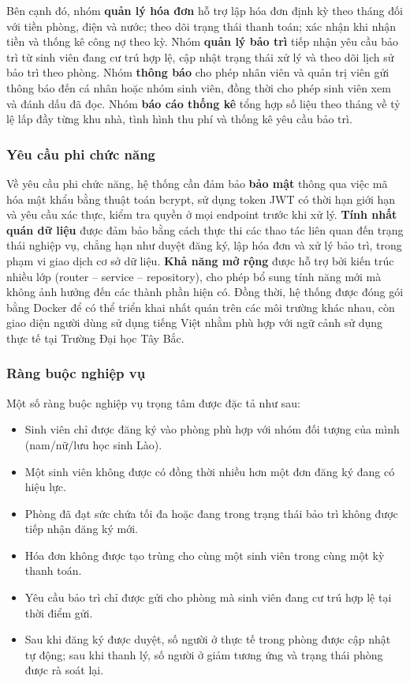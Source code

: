 \documentclass[13pt,a4paper]{extarticle}
\numberwithin{figure}{section}
\numberwithin{table}{section}
\begin{document}
	Bên cạnh đó, nhóm \textbf{quản lý hóa đơn} hỗ trợ lập hóa đơn định kỳ theo tháng đối với tiền phòng, điện và nước; theo dõi trạng thái thanh toán; xác nhận khi nhận tiền và thống kê công nợ theo kỳ. Nhóm \textbf{quản lý bảo trì} tiếp nhận yêu cầu bảo trì từ sinh viên đang cư trú hợp lệ, cập nhật trạng thái xử lý và theo dõi lịch sử bảo trì theo phòng. Nhóm \textbf{thông báo} cho phép nhân viên và quản trị viên gửi thông báo đến cá nhân hoặc nhóm sinh viên, đồng thời cho phép sinh viên xem và đánh dấu đã đọc. Nhóm \textbf{báo cáo thống kê} tổng hợp số liệu theo tháng về tỷ lệ lấp đầy từng khu nhà, tình hình thu phí và thống kê yêu cầu bảo trì.
	
	\subsubsection{Yêu cầu phi chức năng}
	
	Về yêu cầu phi chức năng, hệ thống cần đảm bảo \textbf{bảo mật} thông qua việc mã hóa mật khẩu bằng thuật toán bcrypt, sử dụng token JWT có thời hạn giới hạn và yêu cầu xác thực, kiểm tra quyền ở mọi endpoint trước khi xử lý. \textbf{Tính nhất quán dữ liệu} được đảm bảo bằng cách thực thi các thao tác liên quan đến trạng thái nghiệp vụ, chẳng hạn như duyệt đăng ký, lập hóa đơn và xử lý bảo trì, trong phạm vi giao dịch cơ sở dữ liệu. \textbf{Khả năng mở rộng} được hỗ trợ bởi kiến trúc nhiều lớp (router -- service -- repository), cho phép bổ sung tính năng mới mà không ảnh hưởng đến các thành phần hiện có. Đồng thời, hệ thống được đóng gói bằng Docker để có thể triển khai nhất quán trên các môi trường khác nhau, còn giao diện người dùng sử dụng tiếng Việt nhằm phù hợp với ngữ cảnh sử dụng thực tế tại Trường Đại học Tây Bắc.
	
	\subsubsection{Ràng buộc nghiệp vụ}
	
	Một số ràng buộc nghiệp vụ trọng tâm được đặc tả như sau:
	
	\begin{itemize}
		\item Sinh viên chỉ được đăng ký vào phòng phù hợp với nhóm đối tượng của mình (nam/nữ/lưu học sinh Lào).
		\item Một sinh viên không được có đồng thời nhiều hơn một đơn đăng ký đang có hiệu lực.
		\item Phòng đã đạt sức chứa tối đa hoặc đang trong trạng thái bảo trì không được tiếp nhận đăng ký mới.
		\item Hóa đơn không được tạo trùng cho cùng một sinh viên trong cùng một kỳ thanh toán.
		\item Yêu cầu bảo trì chỉ được gửi cho phòng mà sinh viên đang cư trú hợp lệ tại thời điểm gửi.
		\item Sau khi đăng ký được duyệt, số người ở thực tế trong phòng được cập nhật tự động; sau khi thanh lý, số người ở giảm tương ứng và trạng thái phòng được rà soát lại.
	\end{itemize}
	
\end{document}
